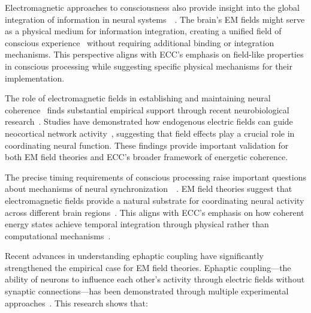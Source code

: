 Electromagnetic approaches to consciousness also provide insight into the global integration of information in neural systems~~\cite{John2001, freeman2006nonlinear}. The brain's EM fields might serve as a physical medium for information integration, creating a unified field of conscious experience~ without requiring additional binding or integration mechanisms. This perspective aligns with ECC's emphasis on field-like properties in conscious processing while suggesting specific physical mechanisms for their implementation.

The role of electromagnetic fields in establishing and maintaining neural coherence~ finds substantial empirical support through recent neurobiological research~\cite{Frohlich2010, lee2024cell}. Studies have demonstrated how endogenous electric fields can guide neocortical network activity~, suggesting that field effects play a crucial role in coordinating neural function. These findings provide important validation for both EM field theories and ECC's broader framework of energetic coherence.

The precise timing requirements of conscious processing raise important questions about mechanisms of neural synchronization~~\cite{Radman2007, hunt2024electromagnetic}. EM field theories suggest that electromagnetic fields provide a natural substrate for coordinating neural activity across different brain regions~. This aligns with ECC's emphasis on how coherent energy states achieve temporal integration through physical rather than computational mechanisms~.

Recent advances in understanding ephaptic coupling have significantly strengthened the empirical case for EM field theories. Ephaptic coupling—the ability of neurons to influence each other's activity through electric fields without synaptic connections—has been demonstrated through multiple experimental approaches~\cite{anastassiou2015ephaptic, Pinotsis2023Ephaptic}. This research shows that:

